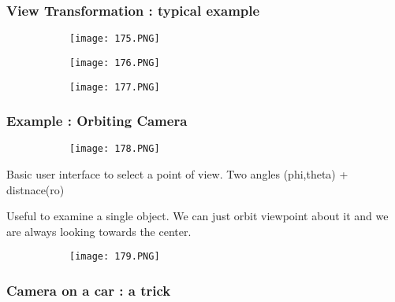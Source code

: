 \documentclass{article}
\begin{document}
\subsubsection{View Transformation : typical example}

\begin{figure}[ht!]
  \centering
  \begin{subfigure}[b]{0.5\linewidth}
    \texttt{[image: 175.PNG]}
  \end{subfigure}
  \begin{subfigure}[b]{0.49\textwidth}
         \centering
         \texttt{[image: 176.PNG]}
     \end{subfigure}
\end{figure}

\begin{figure}[ht!]
  \centering
  \begin{subfigure}[b]{0.55\linewidth}
    \texttt{[image: 177.PNG]}
  \end{subfigure}
\end{figure}


\subsubsection{Example : Orbiting Camera}

\begin{figure}[ht!]
  \centering
  \begin{subfigure}[b]{0.45\linewidth}
    \texttt{[image: 178.PNG]}
  \end{subfigure}
\end{figure}

Basic user interface to select a point of view.
Two angles (phi,theta) + distnace(ro)

Useful to examine a single object. We can just orbit viewpoint about it and we are always looking towards the center.

\begin{figure}[ht!]
  \centering
  \begin{subfigure}[b]{0.45\linewidth}
    \texttt{[image: 179.PNG]}
  \end{subfigure}
\end{figure}

\subsubsection{Camera on a car : a trick}
\end{document}
